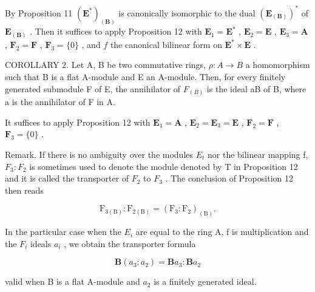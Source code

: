 By Proposition 11 \((\mathbf{E}^{*})_{(\mathbf{B})}\) is canonically isomorphic to the dual \((\mathbf{E}_{(\mathbf{B})})^{*}\) of \(\mathbf{E}_{(\mathbf{B})}\) . Then it suffices to apply Proposition 12 with \(\mathbf{E}_1 = \mathbf{E}^*\) , \(\mathbf{E}_2 = \mathbf{E}\) , \(\mathbf{E}_3 = \mathbf{A}\) , \(\mathbf{F}_2 = \mathbf{F}\) , \(\mathbf{F}_3 = \{0\}\) , and \(f\) the canonical bilinear form on \(\mathbf{E}^{*} \times \mathbf{E}\) .

COROLLARY 2. Let A, B be two commutative rings, \(\rho: A \to B\) a homomorphism such that B is a flat A-module and E an A-module. Then, for every finitely generated submodule F of E, the annihilator of \(F_{(B)}\) is the ideal aB of B, where a is the annihilator of F in A.

It suffices to apply Proposition 12 with \(\mathbf{E}_1 = \mathbf{A}\) , \(\mathbf{E}_2 = \mathbf{E}_3 = \mathbf{E}\) , \(\mathbf{F}_2 = \mathbf{F}\) , \(\mathbf{F}_3 = \{0\}\) .

Remark. If there is no ambiguity over the modules \(E_{t}\) nor the bilinear mapping f, \(F_{3}: F_{2}\) is sometimes used to denote the module denoted by T in Proposition 12 and it is called the transporter of \(F_{2}\) to \(F_{3}\) . The conclusion of Proposition 12 then reads

\[
\mathrm{F} _ {3 (\mathrm{B})}: \mathrm{F} _ {2 (\mathrm{B})} = \left(\mathrm{F} _ {3}: \mathrm{F} _ {2}\right) _ {(\mathrm{B})}.\tag{11}
\]

In the particular case when the \(E_{i}\) are equal to the ring A, f is multiplication and the \(F_{i}\) ideals \(a_{i}\) , we obtain the transporter formula

\[
\mathbf {B} \left(a _ {3}: a _ {2}\right) = \mathbf {B} a _ {3}: \mathbf {B} a _ {2}\tag{12}
\]

valid when B is a flat A-module and \(a_{2}\) is a finitely generated ideal.
